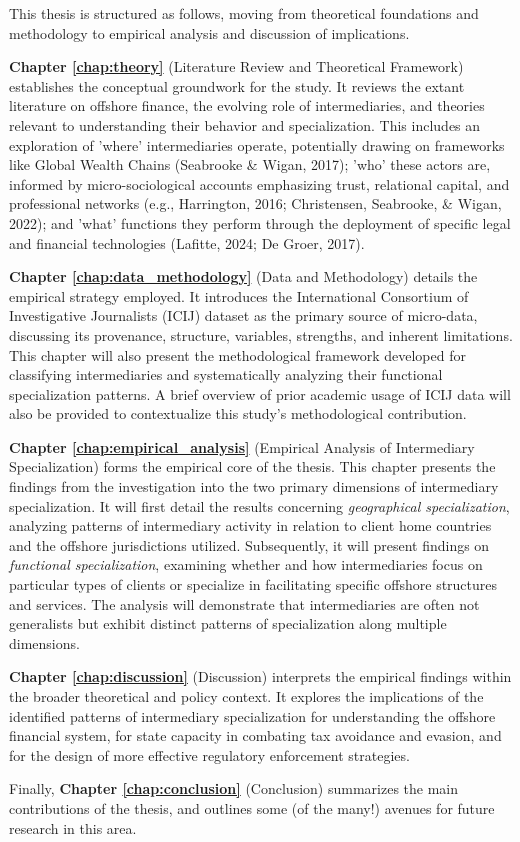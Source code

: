This thesis is structured as follows, moving from theoretical foundations and methodology to empirical analysis and discussion of implications.

\textbf{Chapter \ref{chap:theory}} (Literature Review and Theoretical Framework) establishes the conceptual groundwork for the study. It reviews the extant literature on offshore finance, the evolving role of intermediaries, and theories relevant to understanding their behavior and specialization. This includes an exploration of 'where' intermediaries operate, potentially drawing on frameworks like Global Wealth Chains (Seabrooke \& Wigan, 2017); 'who' these actors are, informed by micro-sociological accounts emphasizing trust, relational capital, and professional networks (e.g., Harrington, 2016; Christensen, Seabrooke, \& Wigan, 2022); and 'what' functions they perform through the deployment of specific legal and financial technologies (Lafitte, 2024; De Groer, 2017).

\textbf{Chapter \ref{chap:data_methodology}} (Data and Methodology) details the empirical strategy employed. It introduces the International Consortium of Investigative Journalists (ICIJ) dataset as the primary source of micro-data, discussing its provenance, structure, variables, strengths, and inherent limitations. This chapter will also present the methodological framework developed for classifying intermediaries and systematically analyzing their functional specialization patterns. A brief overview of prior academic usage of ICIJ data will also be provided to contextualize this study's methodological contribution.

\textbf{Chapter \ref{chap:empirical_analysis}} (Empirical Analysis of Intermediary Specialization) forms the empirical core of the thesis. This chapter presents the findings from the investigation into the two primary dimensions of intermediary specialization. It will first detail the results concerning \textit{geographical specialization}, analyzing patterns of intermediary activity in relation to client home countries and the offshore jurisdictions utilized. Subsequently, it will present findings on \textit{functional specialization}, examining whether and how intermediaries focus on particular types of clients or specialize in facilitating specific offshore structures and services. The analysis will demonstrate that intermediaries are often not generalists but exhibit distinct patterns of specialization along multiple dimensions.

\textbf{Chapter \ref{chap:discussion}} (Discussion) interprets the empirical findings within the broader theoretical and policy context. It explores the implications of the identified patterns of intermediary specialization for understanding the offshore financial system, for state capacity in combating tax avoidance and evasion, and for the design of more effective regulatory enforcement strategies. 

Finally, \textbf{Chapter \ref{chap:conclusion}} (Conclusion) summarizes the main contributions of the thesis, and outlines some (of the many!) avenues for future research in this area. 

